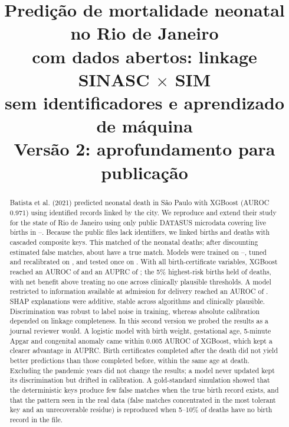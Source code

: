 \documentclass[12pt]{article}
\title{Predição de mortalidade neonatal no Rio de Janeiro\\
com dados abertos: linkage SINASC $\times$ SIM\\
sem identificadores e aprendizado de máquina\\[4pt]
{\large Versão 2: aprofundamento para publicação}}
\author{\nomeautor\inst{1}}
\begin{document}
\maketitle

\begin{abstract}
Batista et al. (2021) predicted neonatal death in São Paulo with XGBoost (AUROC 0.971) using identified records linked by the city. We reproduce and extend their study for the state of Rio de Janeiro using only public DATASUS microdata covering \nNVEn{} live births in \anoIni--\anoFim. Because the public files lack identifiers, we linked births and deaths with cascaded composite keys. This matched \pctPareadoEn{} of the \nObitosSIMEn{} neonatal deaths; after discounting estimated false matches, about \pctVerdadeirosEn{} have a true match. Models were trained on \anoIni--\anoAjFim, tuned and recalibrated on \anoValid{}, and tested once on \anoTeste{}. With all birth-certificate variables, XGBoost reached an AUROC of \AXgbAurocICEn{} and an AUPRC of \AXgbAuprcEn{}; the 5\% highest-risk births held \AXgbTopEn{} of deaths, with net benefit above treating no one across clinically plausible thresholds. A model restricted to information available at admission for delivery reached an AUROC of \BXgbAurocEn{}. SHAP explanations were additive, stable across algorithms and clinically plausible. Discrimination was robust to label noise in training, whereas absolute calibration depended on linkage completeness. In this second version we probed the results as a journal reviewer would. A logistic model with birth weight, gestational age, 5-minute Apgar and congenital anomaly came within 0.005 AUROC of XGBoost, which kept a clearer advantage in AUPRC. Birth certificates completed after the death did not yield better predictions than those completed before, within the same age at death. Excluding the pandemic years did not change the results; a model never updated kept its discrimination but drifted in calibration. A gold-standard simulation showed that the deterministic keys produce few false matches when the true birth record exists, and that the pattern seen in the real data (false matches concentrated in the most tolerant key and an unrecoverable residue) is reproduced when 5--10\% of deaths have no birth record in the file.
\end{abstract}
\end{document}
